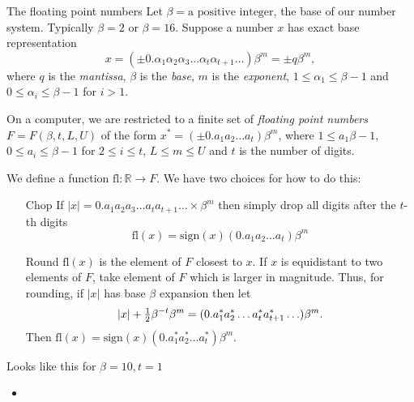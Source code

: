 \documentclass{beamer}
\begin{document}
\begin{frame}{The floating point numbers}
Let $\beta=\text{a positive integer}$, the base of our number system. Typically $\beta=2$ or $\beta=16$.
Suppose a number $x$ has exact base representation
\begin{equation*}
x = (\pm 0.\alpha_1 \alpha_2 \alpha_3 \ldots \alpha_t \alpha_{t+1} \ldots) \beta^m = \pm q \beta^m,
\end{equation*}
where $q$ is the \emph{mantissa}, $\beta$ is the \emph{base}, $m$ is the \emph{exponent}, $1 \leq \alpha_1 \leq \beta - 1$
and $0 \leq \alpha_i \leq \beta - 1$ for $i > 1$.

On a computer, we are restricted to a finite set of \emph{floating point numbers}
$F = F(\beta, t, L, U)$ of the form $x^* = (\pm0.a_1 a_2 \ldots a_t) \beta^m$, where $1 \leq a_1 \beta-1$,
$0 \leq a_i \leq \beta - 1$ for $2 \leq i \leq t$, $L \leq m \leq U$ and $t$ is the number of digits.
\end{frame}

\def\fl{\text{fl}}

\begin{frame}
We define a function $\fl: \mathbb{R} \to F$. We have two choices for how to do this:
\begin{itemize}
\item[Chop] If $|x| = 0.a_1 a_2 a_3 \ldots a_t a_{t+1} \ldots \times \beta^m$ then simply drop all digits
after the $t$-th digits
\begin{equation*}
\fl(x) = \text{sign}(x) (0.a_1 a_2 \ldots a_t) \beta^m
\end{equation*}
\item[Round] $\fl(x)$ is the element of $F$ closest to $x$. If $x$ is equidistant to two elements
of $F$, take element of $F$ which is larger in magnitude. Thus, for rounding, if $|x|$ has base $\beta$
expansion then let
\begin{equation*}
|x| + \tfrac{1}{2} \beta^{-t} \beta^m = (0.a_1^* a_2^* \ldots a_t^* a_{t+1}^*\ldots) \beta^m.
\end{equation*}
Then $\fl(x) = \text{sign}(x) (0.a_1^* a_2^* \ldots a_t^*) \beta^m$.
\end{itemize}
\end{frame}

\begin{frame}{Looks like this for $\beta=10, t=1$}
\begin{itemize}
\item {}
\end{itemize}
\end{frame}
\end{document}
